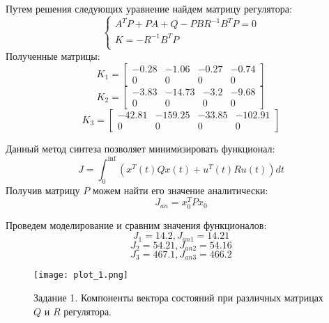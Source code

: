 Путем решения следующих уравнение найдем матрицу регулятора:
\begin{equation}
    \begin{cases}
        A^T P + P A + Q - PBR^{-1}B^TP = 0\\
        K = -R^{-1} B^T P \\
    \end{cases}
\end{equation}
Полученные матрицы:
\begin{equation*}
    K_1 = \begin{bmatrix}
        -0.28 & -1.06 & -0.27 & -0.74 \\
        0 & 0 & 0 & 0
    \end{bmatrix}
\end{equation*}
\begin{equation*}
    K_2 = \begin{bmatrix}
        -3.83 & -14.73 & -3.2 & -9.68 \\
        0 & 0 & 0 & 0
    \end{bmatrix}
\end{equation*}
\begin{equation*}
    K_3 = \begin{bmatrix}
        -42.81 & -159.25 & -33.85 & -102.91 \\
        0 & 0 & 0 & 0
    \end{bmatrix}
\end{equation*}

Данный метод синтеза позволяет минимизировать функционал:
\begin{equation}
    J = \int_{0}^{\inf}(x^T(t)Qx(t)+u^T(t)Ru(t))dt
\end{equation}
Получив матрицу $P$ можем найти его значение аналитически:
\begin{equation}
    J_{an} = x_0^TPx_0
\end{equation}

Проведем моделирование и сравним значения функционалов:
\begin{equation*}
    J_1=14.2, J_{an1}=14.21
\end{equation*}
\begin{equation*}
    J_2=54.21, J_{an2}=54.16
\end{equation*}
\begin{equation*}
    J_3=467.1, J_{an3}=466.2
\end{equation*}

\begin{figure}[h]
    \centering
    \texttt{[image: plot\_1.png]}
    \caption{\label{fig:The-caption-1}Задание 1. Компоненты вектора состояний при различных матрицах $Q$ и $R$ регулятора.}
\end{figure}

